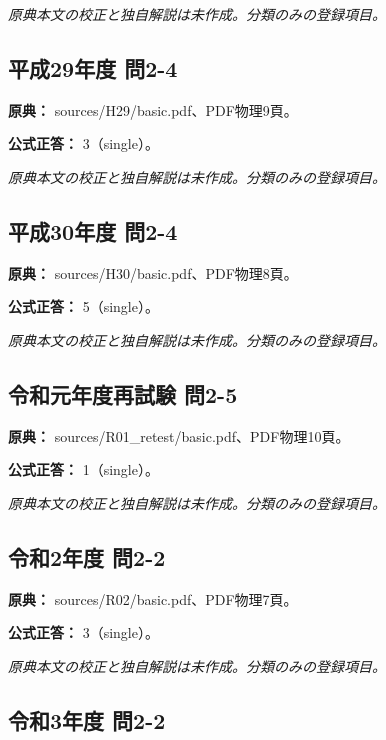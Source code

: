 \par\textit{原典本文の校正と独自解説は未作成。分類のみの登録項目。}

\subsection{平成29年度 問2-4}
\label{q:h29-reg-basic-2-4}

\noindent\textbf{原典：} sources/H29/basic.pdf、PDF物理9頁。

\textbf{公式正答：} 3（single）。

\par\textit{原典本文の校正と独自解説は未作成。分類のみの登録項目。}

\subsection{平成30年度 問2-4}
\label{q:h30-reg-basic-2-4}

\noindent\textbf{原典：} sources/H30/basic.pdf、PDF物理8頁。

\textbf{公式正答：} 5（single）。

\par\textit{原典本文の校正と独自解説は未作成。分類のみの登録項目。}

\subsection{令和元年度再試験 問2-5}
\label{q:r01-ret-basic-2-5}

\noindent\textbf{原典：} sources/R01\_retest/basic.pdf、PDF物理10頁。

\textbf{公式正答：} 1（single）。

\par\textit{原典本文の校正と独自解説は未作成。分類のみの登録項目。}

\subsection{令和2年度 問2-2}
\label{q:r02-reg-basic-2-2}

\noindent\textbf{原典：} sources/R02/basic.pdf、PDF物理7頁。

\textbf{公式正答：} 3（single）。

\par\textit{原典本文の校正と独自解説は未作成。分類のみの登録項目。}

\subsection{令和3年度 問2-2}
\label{q:r03-reg-basic-2-2}

